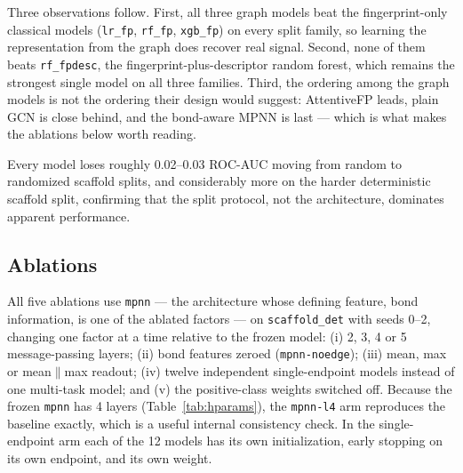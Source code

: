 \documentclass[conference]{IEEEtran}
\newcommand{\code}[1]{\texttt{\small #1}}
\begin{document}
Three observations follow. First, all three graph models beat the fingerprint-only classical
models (\code{lr\_fp}, \code{rf\_fp}, \code{xgb\_fp}) on every split family, so learning the
representation from the graph does recover real signal. Second, none of them beats
\code{rf\_fpdesc}, the fingerprint-plus-descriptor random forest, which remains the strongest
single model on all three families. Third, the ordering among the graph models is not the
ordering their design would suggest: AttentiveFP leads, plain GCN is close behind, and the
bond-aware MPNN is last --- which is what makes the ablations below worth reading.

Every model loses roughly 0.02--0.03 ROC-AUC moving from random to randomized scaffold splits,
and considerably more on the harder deterministic scaffold split, confirming that the split
protocol, not the architecture, dominates apparent performance.

\subsection{Ablations}
All five ablations use \code{mpnn} --- the architecture whose defining feature, bond
information, is one of the ablated factors --- on \code{scaffold\_det} with seeds 0--2, changing
one factor at a time relative to the frozen model: (i) 2, 3, 4 or 5 message-passing layers;
(ii) bond features zeroed (\code{mpnn-noedge}); (iii) mean, max or mean$\|$max readout;
(iv) twelve independent single-endpoint models instead of one multi-task model; and (v) the
positive-class weights switched off. Because the frozen \code{mpnn} has 4 layers
(Table~\ref{tab:hparams}), the \code{mpnn-l4} arm reproduces the baseline exactly, which is a
useful internal consistency check. In the single-endpoint arm each of the 12 models has its own
initialization, early stopping on its own endpoint, and its own weight.
\end{document}
